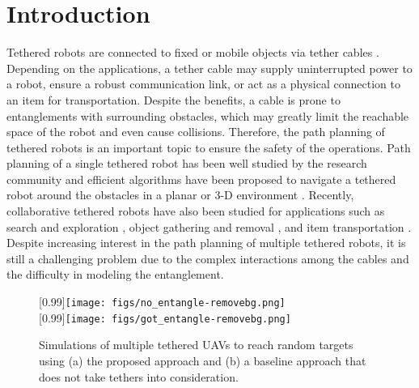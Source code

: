 \documentclass[conference]{IEEEtran}
\begin{document}
\section{Introduction}
Tethered robots are connected to fixed or mobile objects via tether cables \cite{Tognon2017tether}.
Depending on the applications, a tether cable may supply uninterrupted power to a robot, ensure a robust communication link, or act as a physical connection to an item for transportation.
Despite the benefits, a cable is prone to entanglements with surrounding obstacles, which may greatly limit the reachable space of the robot and even cause collisions.
Therefore, the path planning of tethered robots is an important topic to ensure the safety of the operations.
Path planning of a single tethered robot has been well studied by the research community and efficient algorithms have been proposed to navigate a tethered robot around the obstacles in a planar or 3-D environment \cite{Teshnizi2014, Yang2022,kim2014path}.
Recently, collaborative tethered robots have also been studied for applications such as 
search and exploration \cite{Shapovalov2020Exploration, Petit2022},
object gathering and removal \cite{Su2022, Bhattacharya2015}, and
item transportation \cite{Kotaru2020}.
Despite increasing interest in the path planning of multiple tethered robots, it is still a challenging problem due to the complex interactions among the cables and the difficulty in modeling the entanglement.

\begin{figure}
	\centering
    [0.99\linewidth]{\texttt{[image: figs/no\_entangle-removebg.png]}}\\
    [0.99\linewidth]{\texttt{[image: figs/got\_entangle-removebg.png]}}
	\caption{\footnotesize Simulations of multiple tethered UAVs to reach random targets using (a) the proposed approach and (b) a baseline approach that does not take tethers into consideration.
    }  \label{fig: simulation}
\end{figure}
\end{document}
